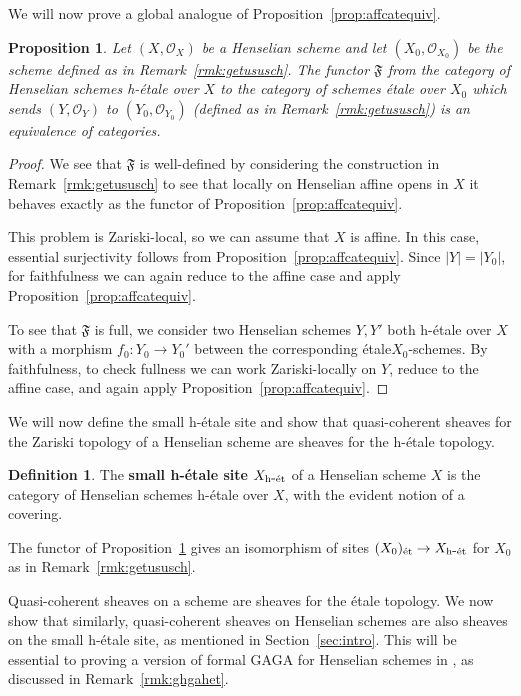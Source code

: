 \documentclass[12pt]{article}
\renewcommand{\O}{\mathscr{O}}
\newcommand{\mf}[1]{\mathfrak{#1}}
\newcommand{\Et}{\'etale\xspace}
\newcommand{\hetale}{h-\'etale\xspace}
\newcommand{\et}{{\rm\acute{e}t}}
\newcommand{\het}{{\rm h\mbox{-}\et}}
\newtheorem{proposition}[theorem]{Proposition}
\theoremstyle{definition}
\newtheorem{definition}[theorem]{Definition}
\numberwithin{equation}{subsection}
\begin{document}
We will now prove a global analogue of Proposition~\ref{prop:affcatequiv}. 

\begin{proposition}\label{prop:globcatequiv} Let $(X,\O_X)$ be a Henselian scheme and let $(X_0,\O_{X_0})$ be the scheme defined as in Remark~\ref{rmk:getususch}. The functor $\mf{F}$ from the category of Henselian schemes \hetale over $X$ to the category of schemes \Et over $X_0$ which sends $(Y,\O_Y)$ to $(Y_0,\O_{Y_0})$ (defined as in Remark~\ref{rmk:getususch}) is an equivalence of categories.
\end{proposition}
\begin{proof}

We see that $\mf{F}$ is well-defined by considering the construction in Remark~\ref{rmk:getususch} to see that locally on Henselian affine opens in $X$ it behaves exactly as the functor of Proposition~\ref{prop:affcatequiv}. 

This problem is Zariski-local, so we can assume that $X$ is affine. In this case, essential surjectivity follows from Proposition~\ref{prop:affcatequiv}. Since $|Y|=|Y_0|$, for faithfulness we can again reduce to the affine case and apply Proposition~\ref{prop:affcatequiv}.


To see that $\mf{F}$ is full, we consider two Henselian schemes $Y,Y'$ both \hetale over $X$ with a morphism $f_0: Y_0 \to Y_0'$ between the corresponding \Et $X_0$-schemes. By faithfulness, to check fullness we can work Zariski-locally on $Y$, 
reduce to the affine case, and again apply Proposition~\ref{prop:affcatequiv}.\end{proof}





We will now define the small \hetale site and show that quasi-coherent sheaves for the Zariski topology of a Henselian scheme are sheaves for the \hetale topology.




\begin{definition}\label{def:hetsite}
The {\bf small \hetale site $X_{\het}$} of a Henselian scheme $X$ is the category of Henselian schemes \hetale over $X$, with the evident notion of a covering. \end{definition}

The functor of Proposition~\ref{prop:globcatequiv} gives an isomorphism of sites $(X_0)_{\et} \to X_{\het}$ for $X_0$ as in Remark~\ref{rmk:getususch}.

Quasi-coherent sheaves on a scheme are sheaves for the \Et topology. We now show that similarly, quasi-coherent sheaves on Henselian schemes are also sheaves on the small \hetale site, as mentioned in Section~\ref{sec:intro}. This will be essential to proving a version of formal GAGA for Henselian schemes in \cite{ghga}, as discussed in Remark~\ref{rmk:ghgahet}.
\end{document}
